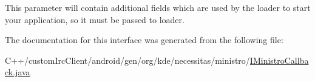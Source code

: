 This parameter will contain additional fields which are used by the loader to start your application, so it must be passed to loader. 

The documentation for this interface was generated from the following file\-:\begin{DoxyCompactItemize}
\item 
C++/custom\-Irc\-Client/android/gen/org/kde/necessitas/ministro/\hyperlink{_i_ministro_callback_8java}{I\-Ministro\-Callback.\-java}\end{DoxyCompactItemize}

